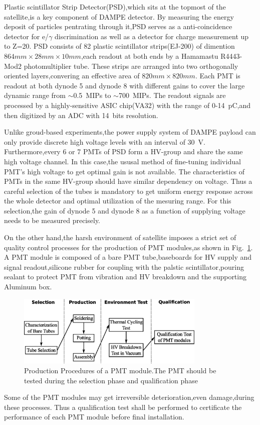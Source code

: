 \documentclass[preprint,5p,times]{elsarticle}
\begin{document}
Plastic scintillator Strip Detector(PSD),which sits at the topmost of the satellite,is a key component of DAMPE detector.
By measuring the energy deposit of particles pentrating through it,PSD serves as a anti-coincidence detector for e/$\gamma$ discrimination as well as a detector for charge measurement up to Z=20.
PSD consists of 82 plastic scintillator strips(EJ-200\cite{ej200}) of dimention $864mm\times28mm\times10mm$,each readout at both ends by a Hamamastu R4443-Mod2 photomultiplier tube.
These strips are arranged into two orthogonally oriented layers,convering an effective area of $820mm\times820mm$.
Each PMT is readout at both dynode 5 and dynode 8 with different gains to cover the large dynamic range from $\sim$0.5~MIPs to $\sim$700~MIPs.
The readout signals are processed by a highly-sensitive ASIC chip(VA32) with the range of 0-14~pC,and then digitized by an ADC with 14~bits resolution.

Unlike groud-based experiments,the power supply system of DAMPE payload can only provide discrete high voltage levels with an interval of 30~V.
Furthermore,every 6 or 7 PMTs of PSD form a HV-group and share the same high voltage channel.
In this case,the ususal method of fine-tuning individual PMT's high voltage to get optimal gain is not available.  
The characteristics of PMTs in the same HV-group should have similar dependency on voltage.
Thus a careful selection of the tubes is mandatory to get uniform energy response across the whole detector and optimal utilization of the mesuring range.
For this selection,the gain of dynode 5 and dynode 8 as a function of supplying voltage needs to be measured precisely.  

On the other hand,the harsh environment of satellite imposes a strict set of quality control processes for the production of PMT modules,as shown in Fig.~\ref{fig:production_procedure}.
A PMT module is composed of a bare PMT tube,baseboards for HV supply and signal readout,silicone rubber for coupling with the palstic scintillator,pouring sealant to protect PMT from vibration and HV breakdown and the supporting Aluminum box.
\begin{figure}[h!]
 \centering
 \includegraphics[width=90mm]{pmt_production_procedure}
\caption{Production Procedures of a PMT module.The PMT should be tested during the selection phase and qualification phase}
\label{fig:production_procedure}
\end{figure} 
Some of the PMT modules may get irreversible deterioration,even damage,during these processes.
Thus a qualification test shall be performed to certificate the performance of each PMT module before final installation. 
\end{document}

